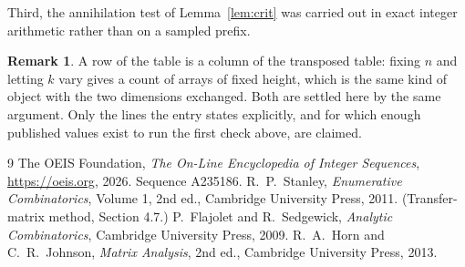 \documentclass[11pt,a4paper]{article}
\theoremstyle{plain}
\theoremstyle{definition}
\newtheorem{remark}[theorem]{Remark}
\begin{document}
Third, the annihilation test of Lemma~\ref{lem:crit} was carried out in exact integer
arithmetic rather than on a sampled prefix.

\begin{remark}
A row of the table is a column of the transposed table: fixing $n$ and letting $k$ vary gives a
count of arrays of fixed height, which is the same kind of object with the two dimensions
exchanged. Both are settled here by the same argument. Only the lines the entry states
explicitly, and for which enough published values exist to run the first check above, are
claimed.
\end{remark}

\begin{thebibliography}{9}
 The OEIS Foundation, \emph{The On-Line Encyclopedia of Integer
Sequences}, \url{https://oeis.org}, 2026. Sequence A235186.
 R.~P.~Stanley, \emph{Enumerative Combinatorics}, Volume 1, 2nd ed.,
Cambridge University Press, 2011. (Transfer-matrix method, Section 4.7.)
 P.~Flajolet and R.~Sedgewick, \emph{Analytic Combinatorics}, Cambridge
University Press, 2009.
 R.~A.~Horn and C.~R.~Johnson, \emph{Matrix Analysis}, 2nd ed., Cambridge
University Press, 2013.
\end{thebibliography}
\end{document}

